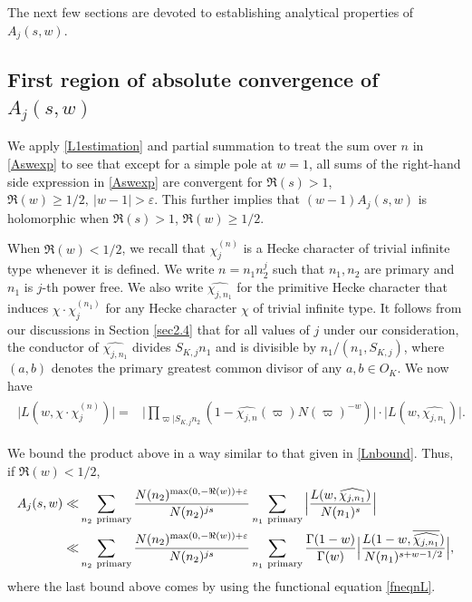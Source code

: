 \documentclass[twoside,leqno,10pt, A4]{amsart}
\begin{document}
The next few sections are devoted to establishing analytical properties of $A_j(s,w)$.
   
\subsection{First region of absolute convergence of $A_j(s,w)$}
\label{Sec: first region}

  We apply \eqref{L1estimation} and partial summation to treat the sum over $n$ in \eqref{Aswexp} to see that except for a simple pole at $w=1$, all sums of the right-hand side expression in \eqref{Aswexp} are convergent for $\Re(s)>1$, $\Re(w) \geq 1/2, \ |w-1|>\varepsilon$. This further implies that $(w-1)A_j(s,w)$ is holomorphic when $\Re(s)>1$, $\Re(w) \geq 1/2$. \newline

  When $\Re(w) < 1/2$,  we recall that $\chi^{(n)}_{j}$ is a Hecke character of trivial infinite type whenever it is defined.  We write $n=n_1n^j_2$ such that $n_1, n_2$ are primary and $n_1$ is $j$-th power free. We also write $\widehat{\chi_{j,n_1}}$ for the primitive Hecke character that induces $\chi \cdot \chi^{(n_1)}_j$ for any Hecke character $\chi$ of trivial infinite type. It follows from our discussions in Section \ref{sec2.4} that for all values of $j$ under our consideration, the conductor of $\widehat{\chi_{j,n_1}}$ divides $S_{K,j}n_1$ and is divisible by $n_1/(n_1, S_{K,j})$, where $(a, b)$ denotes the primary greatest common divisor of any $a, b \in O_K$. We now have
\begin{align*}
\begin{split}
	\big|L(w,  \chi \cdot \chi^{(n)}_j)\big|=&	\big|\prod_{\varpi | S_{K,j}n_2}(1-\widehat{\chi_{j,n}}(\varpi)N(\varpi)^{-w})\big| \cdot
\big| L(w, \widehat{\chi_{j,n_1}})\big|.
\end{split}
\end{align*}

  We bound the product above in a way similar to that given in \eqref{Lnbound}.  Thus, if $\Re(w) < 1/2$,
\begin{align}
\begin{split}
\label{Abound}
		A_j(s,w)
\ll&  \sum_{\substack{n_2 \mathrm{\ primary} }}\frac {N(n_2)^{\max (0,-\Re(w))+\varepsilon}
}{N(n_2)^{js}}\sum_{\substack{n_1 \mathrm{\ primary}}}\Big | \frac{L(w, \widehat{\chi_{j, n_1}})}{N(n_1)^s} \Big | \\
\ll & \sum_{\substack{n_2 \mathrm{\ primary} }}\frac {N(n_2)^{\max (0,-\Re(w))+\varepsilon}
}{N(n_2)^{js}}\sum_{\substack{n_1 \mathrm{\ primary}}}\frac {\Gamma(1-w)}{\Gamma(w)}\Big | \frac{L(1- w, \overline{\widehat{\chi_{j, n_1}}})}{N(n_1)^{s+w-1/2}} \Big |,
\end{split}
\end{align}
  where the last bound above comes by using the functional equation \eqref{fneqnL}. \newline
\end{document}
